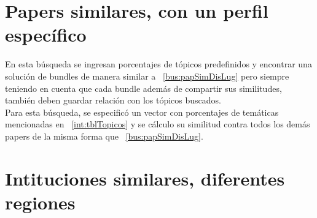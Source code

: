 \section{Papers similares, con un perfil específico}
En esta búsqueda se ingresan porcentajes de tópicos predefinidos y encontrar una solución de 
bundles de manera similar a ~\ref{bus:papSimDisLug} pero siempre teniendo en cuenta que cada 
bundle además de compartir sus similitudes, también deben guardar relación con los tópicos 
buscados.\\
Para esta búsqueda, se especificó un vector con porcentajes de temáticas mencionadas en 
~\ref{int:tblTopicos} y se cálculo su similitud contra todos los demás papers de la misma forma 
que ~\ref{bus:papSimDisLug}.
\section{Intituciones similares, diferentes regiones}
